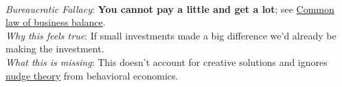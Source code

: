 



\ \\

\textit{Bureaucratic Fallacy}: 
\textbf{You cannot pay a little and get a lot}; see \href{https://en.wikipedia.org/wiki/Common_law_of_business_balance}{Common law of business balance}. \\
\textit{Why this feels true}: If small investments made a big difference we'd already be making the investment.\\
\textit{What this is missing}: This doesn't account for creative solutions and ignores \href{https://en.wikipedia.org/wiki/Nudge_theory}{nudge theory} from behavioral economics. 

